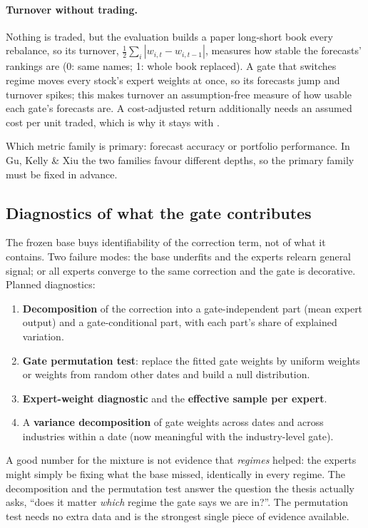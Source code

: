 \paragraph{Turnover without trading.} Nothing is traded, but the evaluation builds a paper long-short book every
rebalance, so its turnover, $\tfrac12\sum_i|w_{i,t}-w_{i,t-1}|$, measures how stable the forecasts' rankings are (0: same
names; 1: whole book replaced). A gate that switches regime moves every stock's expert weights at once, so its
forecasts jump and turnover spikes; this makes turnover an assumption-free measure of how usable each gate's forecasts
are. A cost-adjusted return additionally needs an assumed cost per unit traded, which is why it stays with
.

 Which metric family is primary: forecast accuracy or portfolio performance. In Gu, Kelly \& Xiu
the two families favour different depths, so the primary family must be fixed in advance.

\subsection{Diagnostics of what the gate contributes}

 The frozen base buys identifiability of the correction term, not of what it contains. Two
failure modes: the base underfits and the experts relearn general signal; or all experts converge to the
same correction and the gate is decorative. Planned diagnostics:
\begin{enumerate}
\item \textbf{Decomposition} of the correction into a gate-independent part (mean expert output) and a
  gate-conditional part, with each part's share of explained variation.
\item \textbf{Gate permutation test}: replace the fitted gate weights by uniform weights or weights from random
  other dates and build a null distribution.
\item \textbf{Expert-weight diagnostic} and the \textbf{effective sample per expert}.
\item A \textbf{variance decomposition} of gate weights across dates and across industries within a date (now
  meaningful with the industry-level gate).
\end{enumerate}

\begin{whybox}
A good number for the mixture is not evidence that \emph{regimes} helped: the experts might simply be fixing
what the base missed, identically in every regime. The decomposition and the permutation test answer the
question the thesis actually asks, ``does it matter \emph{which} regime the gate says we are in?''. The
permutation test needs no extra data and is the strongest single piece of evidence available.
\end{whybox}

